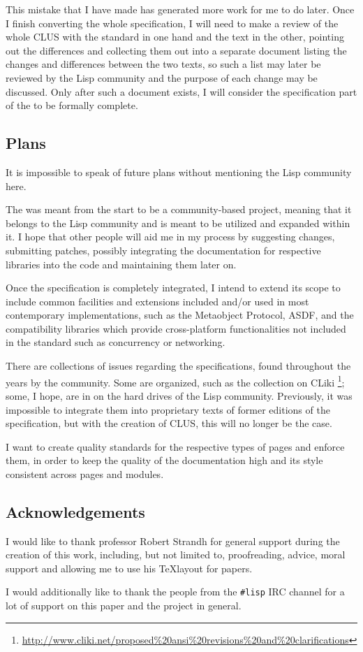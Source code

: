 This mistake that I have made has generated more work for me to do later. Once I finish converting the whole specification, I will need to make a review of the whole CLUS with the standard in one hand and the \us{} text in the other, pointing out the differences and collecting them out into a separate document listing the changes and differences between the two texts, so such a list may later be reviewed by the Lisp community and the purpose of each change may be discussed. Only after such a document exists, I will consider the specification part of the \us{} to be formally complete.

\subsection{Plans}

It is impossible to speak of future plans without mentioning the Lisp community here.

The \cl{} \us{} was meant from the start to be a community-based project, meaning that it belongs to the Lisp community and is meant to be utilized and expanded within it. I hope that other people will aid me in my process by suggesting changes, submitting patches, possibly integrating the documentation for respective \cl{} libraries into the code and maintaining them later on.

Once the specification is completely integrated, I intend to extend its scope to include common facilities and extensions included and/or used in most contemporary \cl{} implementations, such as the Metaobject Protocol, ASDF, \ql{} and the compatibility libraries which provide cross-platform functionalities not included in the standard such as concurrency or networking.

There are collections of issues regarding the specifications, found throughout the years by the community. Some are organized, such as the collection on CLiki \footnote{\url{http://www.cliki.net/proposed\%20ansi\%20revisions\%20and\%20clarifications}}; some, I hope, are in on the hard drives of the Lisp community. Previously, it was impossible to integrate them into proprietary texts of former editions of the specification, but with the creation of CLUS, this will no longer be the case.

I want to create quality standards for the respective types of pages and enforce them, in order to keep the quality of the documentation high and its style consistent across pages and modules.

\subsection{Acknowledgements}

I would like to thank professor Robert Strandh for general support during the creation of this work, including, but not limited to, proofreading, advice, moral support and allowing me to use his \TeX layout for papers.

I would additionally like to thank the people from the \texttt{\#lisp} IRC channel for a lot of support on this paper and the \cl{} \us{} project in general.
